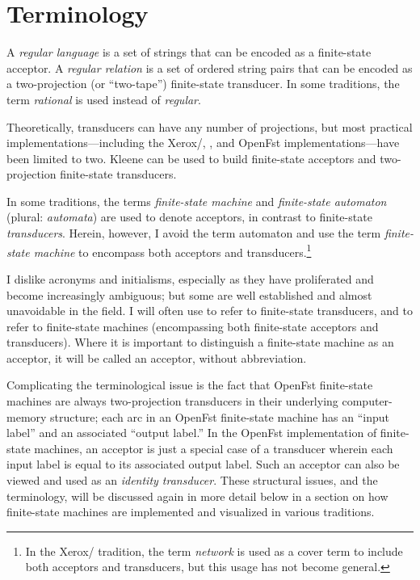 \section{Terminology}

A \emph{regular language} is a set of strings that can be encoded as a
finite-state acceptor.  A \emph{regular relation}
is a set of ordered string pairs that can be
encoded as a two-projection (or ``two-tape'') finite-state transducer.
In some traditions, the term \emph{rational} is used instead of
\emph{regular}.


Theoretically, transducers can have any number of projections, but most
practical implementations---including the
Xerox/, ,  and OpenFst implementations---have been limited to two.  Kleene can be used to build finite-state acceptors
and two-projection finite-state transducers.

In some traditions, the terms \emph{finite-state machine} and \emph{finite-state automaton}
(plural: \emph{automata}) are used to
denote acceptors, in contrast to finite-state \emph{transducers}.  Herein, however, I avoid the
term automaton and use the term \emph{finite-state machine} to encompass both
acceptors and transducers.\footnote{In the Xerox/ tradition, the term
\emph{network} is used as a cover term to include both acceptors and transducers, but this
usage has not become general.}

I dislike acronyms and initialisms, especially as they have proliferated and become
increasingly
ambiguous; but some are well established and almost unavoidable in the field.  I will often use
\emph{\fst{}} to refer to finite-state transducers, and \emph{\fsm{}} to refer to finite-state machines
(encompassing both finite-state acceptors and transducers).
Where it is important to distinguish a finite-state machine as an acceptor, it will be
called an acceptor, without abbreviation.

Complicating the terminological issue is the fact that OpenFst
finite-state machines are always two-projection transducers in their
underlying computer-memory structure; each arc in an OpenFst finite-state machine has an ``input
label'' and an associated ``output label.''  In the OpenFst
implementation of finite-state machines, an acceptor is just a special
case of a transducer wherein each input label is equal to its associated
output label.  Such an acceptor can also be viewed and used as an
\emph{identity transducer}.  These structural issues, and the
terminology, will be discussed again in more detail below in a section
on how finite-state machines are implemented and visualized in various
traditions.


